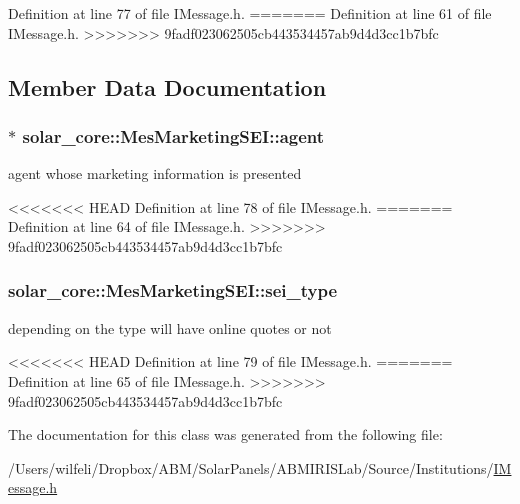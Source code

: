 Definition at line 77 of file I\+Message.\+h.
=======
Definition at line 61 of file I\+Message.\+h.
>>>>>>> 9fadf023062505cb443534457ab9d4d3cc1b7bfc



\subsection{Member Data Documentation}
\hypertarget{classsolar__core_1_1_mes_marketing_s_e_i_a5bc5eb8bf309e6ba96cfdc0feb01baa9}{}
\subsubsection[{agent}]{$\ast$ solar\+\_\+core\+::\+Mes\+Marketing\+S\+E\+I\+::agent}\label{classsolar__core_1_1_mes_marketing_s_e_i_a5bc5eb8bf309e6ba96cfdc0feb01baa9}
agent whose marketing information is presented 

<<<<<<< HEAD
Definition at line 78 of file I\+Message.\+h.
=======
Definition at line 64 of file I\+Message.\+h.
>>>>>>> 9fadf023062505cb443534457ab9d4d3cc1b7bfc

\hypertarget{classsolar__core_1_1_mes_marketing_s_e_i_a8897df83278137d8ff4b04c068e4370e}{}
\subsubsection[{sei\+\_\+type}]{ solar\+\_\+core\+::\+Mes\+Marketing\+S\+E\+I\+::sei\+\_\+type}\label{classsolar__core_1_1_mes_marketing_s_e_i_a8897df83278137d8ff4b04c068e4370e}
depending on the type will have online quotes or not 

<<<<<<< HEAD
Definition at line 79 of file I\+Message.\+h.
=======
Definition at line 65 of file I\+Message.\+h.
>>>>>>> 9fadf023062505cb443534457ab9d4d3cc1b7bfc



The documentation for this class was generated from the following file\+:\begin{DoxyCompactItemize}
\item 
/\+Users/wilfeli/\+Dropbox/\+A\+B\+M/\+Solar\+Panels/\+A\+B\+M\+I\+R\+I\+S\+Lab/\+Source/\+Institutions/\hyperlink{_i_message_8h}{I\+Message.\+h}\end{DoxyCompactItemize}
